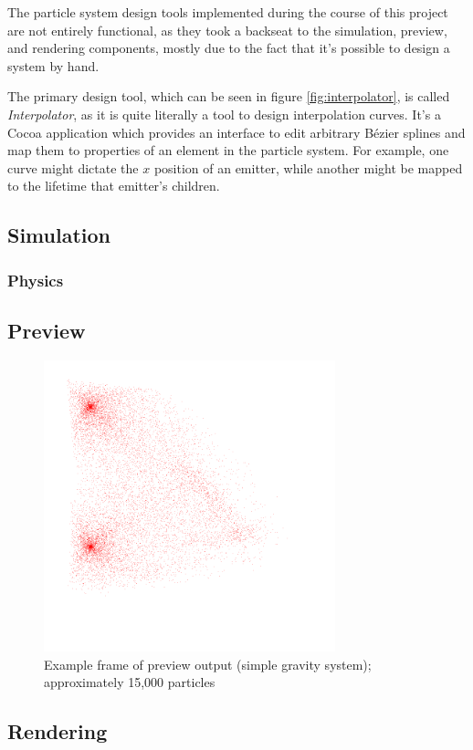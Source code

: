 \documentclass{acmsiggraph}
\begin{document}
The particle system design tools implemented during the course of this project are not entirely functional, as they took a backseat to the simulation, preview, and rendering components, mostly due to the fact that it's possible to design a system by hand.

The primary design tool, which can be seen in figure \ref{fig:interpolator}, is called {\it Interpolator}, as it is quite literally a tool to design interpolation curves. It's a Cocoa application which provides an interface to edit arbitrary B\'{e}zier splines and map them to properties of an element in the particle system. For example, one curve might dictate the $x$ position of an emitter, while another might be mapped to the lifetime that emitter's children.

\subsection{Simulation}

\subsubsection{Physics}

\subsection{Preview}

\begin{figure}
    \includegraphics[width=84.5mm]{preview.png}
    \caption{Example frame of preview output (simple gravity system); approximately 15,000 particles}
    \label{fig:preview}
\end{figure}

\subsection{Rendering}
\end{document}
